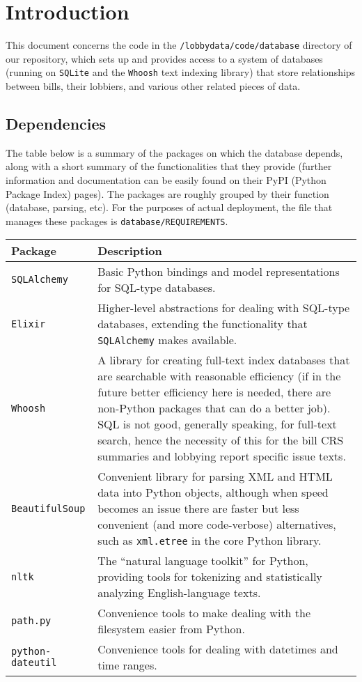 \documentclass[11pt,letterpaper]{article}
\theoremstyle{plain}
\begin{document}
\section{Introduction}

This document concerns the code in the \texttt{/lobbydata/code/database}
directory of our repository, which sets up and provides access to a
system of databases (running on \texttt{SQLite} and the
\texttt{Whoosh} text indexing library) that store relationships
between bills, their lobbiers, and various other related pieces of
data.

\subsection{Dependencies}

The table below is a summary of the packages on which the database
depends, along with a short summary of the functionalities that they
provide (further information and documentation can be easily found on
their PyPI (Python Package Index) pages).  The packages are roughly
grouped by their function (database, parsing, etc).  For the purposes
of actual deployment, the file that manages these packages is
\texttt{database/REQUIREMENTS}.

\begin{center}
\begin{tabular}{lp{12cm}}
  \bf{Package} & \bf{Description} \\
  \toprule
  \texttt{SQLAlchemy} & Basic Python bindings and model representations for SQL-type databases. \\
  \texttt{Elixir} & Higher-level abstractions for dealing with SQL-type databases, extending the functionality that \texttt{SQLAlchemy} makes available. \\
  \midrule
  \texttt{Whoosh} & A library for creating full-text index databases that are searchable with reasonable efficiency (if in the future better efficiency here is needed, there are non-Python packages that can do a better job). SQL is not good, generally speaking, for full-text search, hence the necessity of this for the bill CRS summaries and lobbying report specific issue texts. \\
  \midrule
  \texttt{BeautifulSoup} & Convenient library for parsing XML and HTML data into Python objects, although when speed becomes an issue there are faster but less convenient (and more code-verbose) alternatives, such as \texttt{xml.etree} in the core Python library. \\
  \texttt{nltk} & The ``natural language toolkit'' for Python, providing tools for tokenizing and statistically analyzing English-language texts. \\
  \midrule
  \texttt{path.py} & Convenience tools to make dealing with the filesystem easier from Python. \\
  \texttt{python-dateutil} & Convenience tools for dealing with datetimes and time ranges. \\
\end{tabular}

\end{center}
\end{document}

